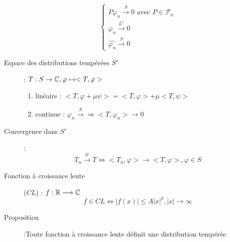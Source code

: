 \begin{description}
\[\begin{cases}
            P\varphi_n\overset{S}{\longrightarrow}0\textrm{ avec }P\in\mathcal P_n\\
            \varphi_n\overset{L^1}{\longrightarrow}0\\
            \widehat{\varphi_n}\overset{S}{\longrightarrow}0
        \end{cases}
    \]
\item[Espace des distributions tempérées $S'$] : $T:S\rightarrow\mathbb{C}, \varphi\mapsto<T,\varphi>$
\begin{enumerate}
    \item linéaire : $<T,\varphi+\mu\psi>=<T,\varphi>+\mu<T,\psi>$
    \item continue : $\varphi_n\overset{S}{\longrightarrow}\Rightarrow<T,\varphi_n>\longrightarrow 0$
\end{enumerate}
\item[Convergence dans $S'$] :
    \[
        T_n\overset{S'}{\longrightarrow}T
        \Leftrightarrow
        <T_n,\varphi>\longrightarrow<T,\varphi>,\varphi\in S
    \]
\item[Fonction à croissance lente] ($CL$) : $f:\mathbb{R}\longrightarrow\mathbb{C}$
    \[
        f\in CL\Leftrightarrow|f(x)|\le A|x|^p, |x|\longrightarrow\infty
    \]
\item[Proposition] :Toute fonction à croissance lente définit une distribution tempérée
\end{description}
